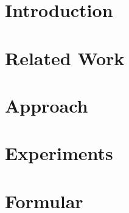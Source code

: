 \documentclass[]{report}
\title{}
\author{Jingyuan Sha}
\begin{document}
\maketitle

\begin{abstract}
\end{abstract}



\newpage
\chapter{Introduction}



\newpage
\chapter{Related Work}


\newpage
\chapter{Approach}


\newpage
\chapter{Experiments}




\newpage
\chapter{Formular}



\medskip



\end{document}

